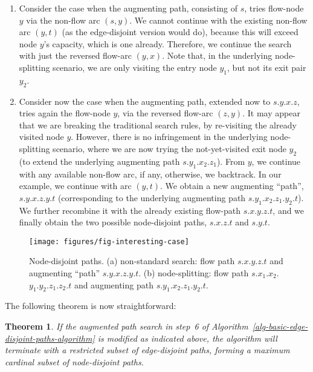 \documentclass[preliminary,copyright,creativecommons]{eptcs}
\newtheorem{theorem}{Theorem}
\theoremstyle{remark}
\begin{document}
\begin{enumerate}
\item Consider the case when the augmenting path, consisting of $s$,
tries flow-node $y$ via the non-flow arc $(s,y)$.
We cannot continue with the existing non-flow arc $(y,t)$
(as the edge-disjoint version would do), 
because this will exceed node $y$'s capacity, which is one already.
Therefore, we continue the search 
with just the reversed flow-arc $(y,x)$.
Note that, in the underlying node-splitting scenario,
we are only visiting the entry node $y_1$, but not its exit pair $y_2$. 

\item Consider now the case when the augmenting path, extended now to $s$.$y$.$x$.$z$,
tries again the flow-node $y$, via the reversed flow-arc $(z,y)$.
It may appear that we are breaking the traditional search rules,
by re-visiting the already visited node $y$.
However, there is no infringement in the underlying node-splitting scenario,
where we are now trying the not-yet-visited exit node $y_2$
(to extend the underlying augmenting path $s$.$y_1$.$x_2$.$z_1$).
From $y$, we continue with any available non-flow arc, if any, 
otherwise, we backtrack. In our example, we continue with arc $(y,t)$.
We obtain a new augmenting ``path'', $s$.$y$.$x$.$z$.$y$.$t$
(corresponding to the underlying augmenting path $s$.$y_1$.$x_2$.$z_1$.$y_2$.$t$).
We further recombine it with the already existing flow-path $s$.$x$.$y$.$z$.$t$,
and we finally obtain the two possible node-disjoint paths,
$s$.$x$.$z$.$t$ and $s$.$y$.$t$.
\end{enumerate}

\begin{figure}[h]
\centerline{\texttt{[image: figures/fig-interesting-case]}}
\caption{Node-disjoint paths.
(a) non-standard search: flow path $s$.$x$.$y$.$z$.$t$ and augmenting ``path'' $s$.$y$.$x$.$z$.$y$.$t$.
(b) node-splitting: flow path $s$.$x_1$.$x_2$.$y_1$.$y_2$.$z_1$.$z_2$.$t$ and 
augmenting path $s$.$y_1$.$x_2$.$z_1$.$y_2$.$t$.
}
\label{fig-interesting-case}
\end{figure}

The following theorem is now straightforward:

\begin{theorem}
If the augmented path search in step~6 of Algorithm~\ref{alg-basic-edge-disjoint-paths-algorithm} is modified as indicated above,
the algorithm will terminate with a restricted subset of edge-disjoint paths,
forming a maximum cardinal subset of node-disjoint paths.
\end{theorem}
\end{document}
